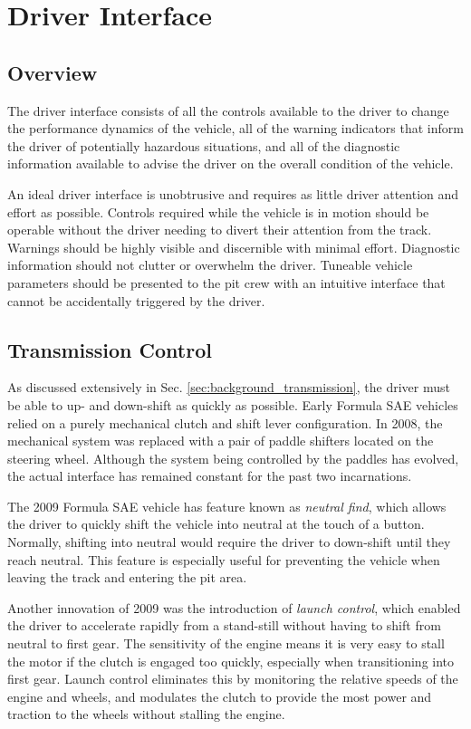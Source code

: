\section{Driver Interface}

\subsection{Overview}

The driver interface consists of all the controls available to the driver to change the performance dynamics of the vehicle, all of the warning indicators that inform the driver of potentially hazardous situations, and all of the diagnostic information available to advise the driver on the overall condition of the vehicle.

An ideal driver interface is unobtrusive and requires as little driver attention and effort as possible. Controls required while the vehicle is in motion should be operable without the driver needing to divert their attention from the track. Warnings should be highly visible and discernible with minimal effort. Diagnostic information should not clutter or overwhelm the driver. Tuneable vehicle parameters should be presented to the pit crew with an intuitive interface that cannot be accidentally triggered by the driver.

\subsection{Transmission Control}

As discussed extensively in Sec. \ref{sec:background_transmission}, the driver must be able to up- and down-shift as quickly as possible. Early Formula SAE vehicles relied on a purely mechanical clutch and shift lever configuration. In 2008, the mechanical system was replaced with a pair of paddle shifters located on the steering wheel. Although the system being controlled by the paddles has evolved, the actual interface has remained constant for the past two incarnations.

The 2009 Formula SAE vehicle has feature known as \emph{neutral find}, which allows the driver to quickly shift the vehicle into neutral at the touch of a button. Normally, shifting into neutral would require the driver to down-shift until they reach neutral. This feature is especially useful for preventing the vehicle when leaving the track and entering the pit area. 

Another innovation of 2009 was the introduction of \emph{launch control}, which enabled the driver to accelerate rapidly from a stand-still without having to shift from neutral to first gear. The sensitivity of the engine means it is very easy to stall the motor if the clutch is engaged too quickly, especially when transitioning into first gear. Launch control eliminates this by monitoring the relative speeds of the engine and wheels, and modulates the clutch to provide the most power and traction to the wheels without stalling the engine. 

